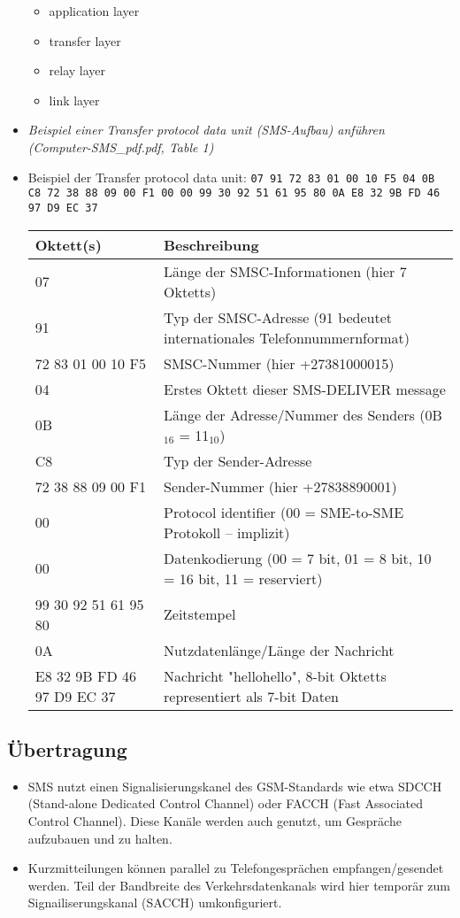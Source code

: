 \documentclass[german,12pt,a4paper]{article}
\begin{document}
\begin{itemize}
\begin{itemize}
			\item application layer
			\item transfer layer
			\item relay layer
			\item link layer
		\end{itemize}		
	\item \textit{Beispiel einer Transfer protocol data unit (SMS-Aufbau) anführen \\(Computer-SMS\_pdf.pdf, Table 1)}
	\item Beispiel der Transfer protocol data unit: 
		\small{\texttt{07 91 72 83 01 00 10 F5 04 0B C8 72 38 88 09 00 F1 00 00 99 30 92 51 61 95 80 0A E8 32 9B FD 46 97 D9 EC 37}}
		
		\begin{tabular}{ p{4cm} | p{10cm} }
			Oktett(s) & Beschreibung \\
			\hline \hline
		  	 07 & Länge der SMSC-Informationen (hier 7 Oktetts) \\ 
		  	 \hline
		  	 91 & Typ der SMSC-Adresse (91 bedeutet internationales Telefonnummernformat) \\ 
		  	 \hline
		  	 72 83 01 00 10 F5 & SMSC-Nummer (hier +27381000015) \\ 
		  	 \hline
		  	 04 & Erstes Oktett dieser SMS-DELIVER message \\ 
		  	 \hline
		  	 0B & Länge der Adresse/Nummer des Senders (0B$_{16}$ = 11$_{10}$) \\ 
		  	 \hline
		  	 C8 & Typ der Sender-Adresse \\ 
		  	 \hline
		  	 72 38 88 09 00 F1 & Sender-Nummer (hier +27838890001) \\ 
		  	 \hline
		  	 00 & Protocol identifier (00 = SME-to-SME Protokoll -- implizit) \\ 
		  	 \hline
		  	 00 & Datenkodierung (00 = 7 bit, 01 = 8 bit, 10 = 16 bit, 11 = reserviert) \\ 
		  	 \hline
		  	 99 30 92 51 61 95 80 & Zeitstempel \\ 
		  	 \hline
		  	 0A & Nutzdatenlänge/Länge der Nachricht \\ 
		  	 \hline
		  	 E8 32 9B FD 46 97 D9 EC 37 & Nachricht "hellohello", 8-bit Oktetts representiert als 7-bit Daten
		\end{tabular}
\end{itemize}

\subsection{Übertragung}
\begin{itemize}
	\item SMS nutzt einen Signalisierungskanel des GSM-Standards wie etwa SDCCH (Stand-alone Dedicated Control Channel) 
		oder FACCH (Fast Associated Control Channel). Diese Kanäle werden auch genutzt, um Gespräche aufzubauen und zu 
		halten.
	\item Kurzmitteilungen können parallel zu Telefongesprächen empfangen/gesendet werden. Teil der Bandbreite des 
		Verkehrsdatenkanals wird hier temporär zum Signailiserungskanal (SACCH) umkonfiguriert.
\end{itemize}
\end{document}
